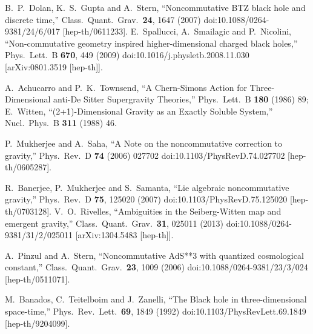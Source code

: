 \documentclass[11pt]{article}
\numberwithin{equation}{section}
\begin{document}
\begin{thebibliography}{99}
  B.~P.~Dolan, K.~S.~Gupta and A.~Stern,
  ``Noncommutative BTZ black hole and discrete time,''
  Class.\ Quant.\ Grav.\  {\bf 24}, 1647 (2007)
  doi:10.1088/0264-9381/24/6/017
  [hep-th/0611233].
  E.~Spallucci, A.~Smailagic and P.~Nicolini,
  ``Non-commutative geometry inspired higher-dimensional charged black holes,''
  Phys.\ Lett.\ B {\bf 670}, 449 (2009)
  doi:10.1016/j.physletb.2008.11.030
  [arXiv:0801.3519 [hep-th]].

  A.~Achucarro and P.~K.~Townsend,
  ``A Chern-Simons Action for Three-Dimensional anti-De Sitter Supergravity Theories,''
  Phys.\ Lett.\ B {\bf 180} (1986) 89;\\
  E.~Witten,
  ``(2+1)-Dimensional Gravity as an Exactly Soluble System,''
  Nucl.\ Phys.\ B {\bf 311} (1988) 46.

  P.~Mukherjee and A.~Saha,
  ``A Note on the noncommutative correction to gravity,''
  Phys.\ Rev.\ D {\bf 74} (2006) 027702
  doi:10.1103/PhysRevD.74.027702
  [hep-th/0605287].


  R.~Banerjee, P.~Mukherjee and S.~Samanta,
  ``Lie algebraic noncommutative gravity,''
  Phys.\ Rev.\ D {\bf 75}, 125020 (2007)
  doi:10.1103/PhysRevD.75.125020
  [hep-th/0703128].
  V.~O.~Rivelles,
  ``Ambiguities in the Seiberg-Witten map and emergent gravity,''
  Class.\ Quant.\ Grav.\  {\bf 31}, 025011 (2013)
  doi:10.1088/0264-9381/31/2/025011
  [arXiv:1304.5483 [hep-th]].

  A.~Pinzul and A.~Stern,
  ``Noncommutative AdS**3 with quantized cosmological constant,''
  Class.\ Quant.\ Grav.\  {\bf 23}, 1009 (2006)
  doi:10.1088/0264-9381/23/3/024
  [hep-th/0511071].


  M.~Banados, C.~Teitelboim and J.~Zanelli,
  ``The Black hole in three-dimensional space-time,''
  Phys.\ Rev.\ Lett.\  {\bf 69}, 1849 (1992)
  doi:10.1103/PhysRevLett.69.1849
  [hep-th/9204099].


\end{thebibliography}
\end{document}
